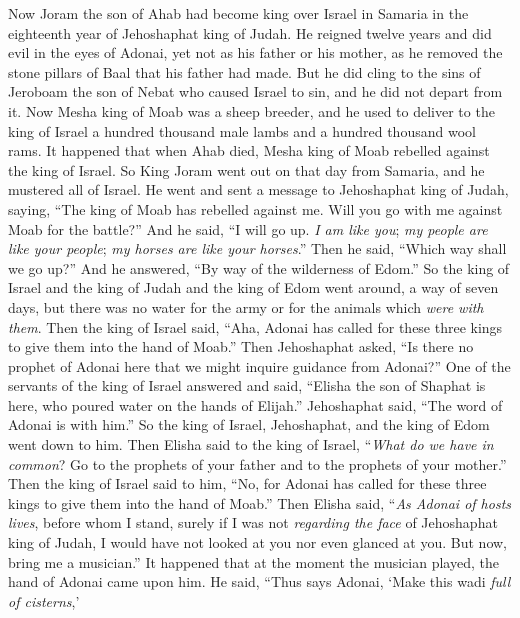 \begin{biblechapter} %
 Now Joram the son of Ahab had become king over Israel in Samaria in the eighteenth year of Jehoshaphat king of Judah. He reigned twelve years
\verse and did evil in the eyes of Adonai, yet not as his father or his mother, as he removed the stone pillars of Baal that his father had made.
\verse But he did cling to the sins of Jeroboam the son of Nebat who caused Israel to sin, and he did not depart from it.
\verse Now Mesha king of Moab was a sheep breeder, and he used to deliver to the king of Israel a hundred thousand male lambs and a hundred thousand wool rams.
\verse It happened that when Ahab died, Mesha king of Moab rebelled against the king of Israel.
\verse So King Joram went out on that day from Samaria, and he mustered all of Israel.
\verse He went and sent a message to Jehoshaphat king of Judah, saying, “The king of Moab has rebelled against me. Will you go with me against Moab for the battle?” And he said, “I will go up. \textit{I am like you}; \textit{my people are like your people}; \textit{my horses are like your horses}.”
\verse Then he said, “Which way shall we go up?” And he answered, “By way of the wilderness of Edom.”
\verse So the king of Israel and the king of Judah and the king of Edom went around, a way of seven days, but there was no water for the army or for the animals which \textit{were with them}.
\verse Then the king of Israel said, “Aha, Adonai has called for these three kings to give them into the hand of Moab.”
\verse Then Jehoshaphat asked, “Is there no prophet of Adonai here that we might inquire guidance from Adonai?” One of the servants of the king of Israel answered and said, “Elisha the son of Shaphat is here, who poured water on the hands of Elijah.”
\verse Jehoshaphat said, “The word of Adonai is with him.” So the king of Israel, Jehoshaphat, and the king of Edom went down to him.
\verse Then Elisha said to the king of Israel, “\textit{What do we have in common}? Go to the prophets of your father and to the prophets of your mother.” Then the king of Israel said to him, “No, for Adonai has called for these three kings to give them into the hand of Moab.”
\verse Then Elisha said, “\textit{As Adonai of hosts lives}, before whom I stand, surely if I was not \textit{regarding the face} of Jehoshaphat king of Judah, I would have not looked at you nor even glanced at you.
\verse But now, bring me a musician.” It happened that at the moment the musician played, the hand of Adonai came upon him.
\verse He said, “Thus says Adonai, ‘Make this wadi \textit{full of cisterns},’

\end{biblechapter}

